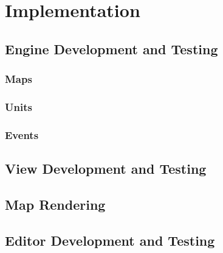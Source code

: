 \section{Implementation}

\subsection{Engine Development and Testing}
\label{sub:engine_development_and_testing}

\subsubsection{Maps}
\label{ssub:maps}

\subsubsection{Units}
\label{ssub:units}

\subsubsection{Events}
\label{ssub:events}


\subsection{View Development and Testing}

\subsection{Map Rendering}
\label{sub:map_rendering}


\subsection{Editor Development and Testing}